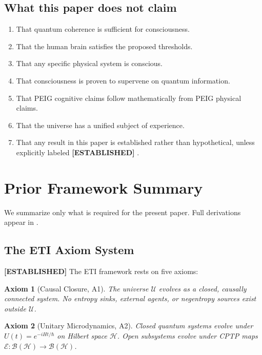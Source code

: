 \documentclass[12pt,letterpaper]{article}
\newtheorem{axiom}{Axiom}[section]
\newcommand{\ESTABLISHED}[1]{\textcolor{green!50!black}{\textbf{[ESTABLISHED]}} #1}
\begin{document}
\subsection{What this paper does not claim}

\begin{enumerate}[label=(\roman*)]
  \item That quantum coherence is sufficient for consciousness.
  \item That the human brain satisfies the proposed thresholds.
  \item That any specific physical system is conscious.
  \item That consciousness is proven to supervene on quantum information.
  \item That PEIG cognitive claims follow mathematically from PEIG physical claims.
  \item That the universe has a unified subject of experience.
  \item That any result in this paper is established rather than hypothetical,
    unless explicitly labeled \ESTABLISHED{}.
\end{enumerate}

\section{Prior Framework Summary}
\label{sec:prior}

We summarize only what is required for the present paper. Full derivations
appear in \cite{Monette2026a,Monette2026b,Monette2026c}.

\subsection{The ETI Axiom System}
\label{sec:prior_eti}

\ESTABLISHED{} The ETI framework rests on five axioms:

\begin{axiom}[Causal Closure, A1]
The universe $\mathcal{U}$ evolves as a closed, causally connected system.
No entropy sinks, external agents, or negentropy sources exist outside
$\mathcal{U}$.
\end{axiom}

\begin{axiom}[Unitary Microdynamics, A2]
Closed quantum systems evolve under $U(t) = e^{-iHt/\hbar}$ on Hilbert
space $\mathcal{H}$. Open subsystems evolve under CPTP maps
$\mathcal{E}: \mathcal{B}(\mathcal{H}) \to \mathcal{B}(\mathcal{H})$.
\end{axiom}
\end{document}
